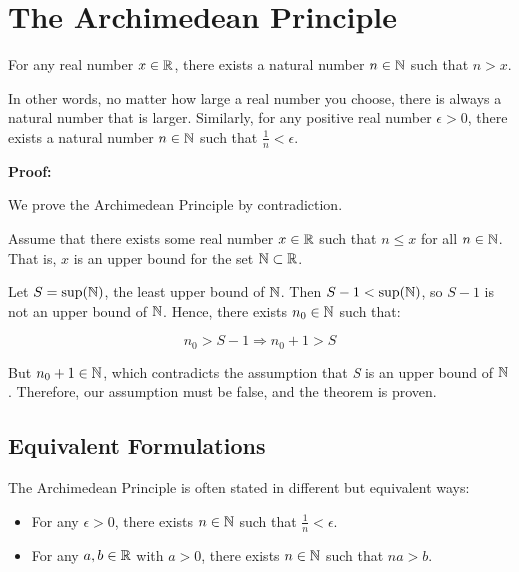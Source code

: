 \newpage
\section{The Archimedean Principle}

For any real number \( x \in \mathbb{R} \), there exists a natural number \( n \in \mathbb{N} \) such 
that \( n > x \).
\vspace{\baselineskip}

In other words, no matter how large a real number you choose, there is always a natural number that 
is larger. Similarly, for any positive real number \( \epsilon > 0 \), there exists a natural number 
\( n \in \mathbb{N} \) such that \( \frac{1}{n} < \epsilon \).
\vspace{\baselineskip}

\textbf{Proof:}

We prove the Archimedean Principle by contradiction.
\vspace{\baselineskip}

Assume that there exists some real number \( x \in \mathbb{R} \) such that \( n \leq x \) for all 
\( n \in \mathbb{N} \). That is, \(x\) is an upper bound for the set \( \mathbb{N} \subset \mathbb{R}\).
\vspace{\baselineskip}

Let \( S = \sup(\mathbb{N}) \), the least upper bound of \( \mathbb{N} \). Then 
\( S - 1 < \sup(\mathbb{N}) \), so \( S - 1 \) is not an upper bound of \( \mathbb{N} \). Hence, 
there exists \( n_0 \in \mathbb{N} \) such that:

\[
	n_0 > S - 1 \Rightarrow n_0 + 1 > S
\]

But \( n_0 + 1 \in \mathbb{N} \), which contradicts the assumption that \emph{S} is an upper bound of 
\(\mathbb{N} \). Therefore, our assumption must be false, and the theorem is proven.

\QED

\subsection{Equivalent Formulations}

The Archimedean Principle is often stated in different but equivalent ways:

\begin{itemize}
	
	\item For any \( \epsilon > 0 \), there exists \( n \in \mathbb{N} \) such that \( \frac{1}{n} < 
		  \epsilon \).
	
	\item For any \( a, b \in \mathbb{R} \) with \( a > 0 \), there exists \( n \in \mathbb{N} \) such that 
	      \( na > b \).

\end{itemize}

